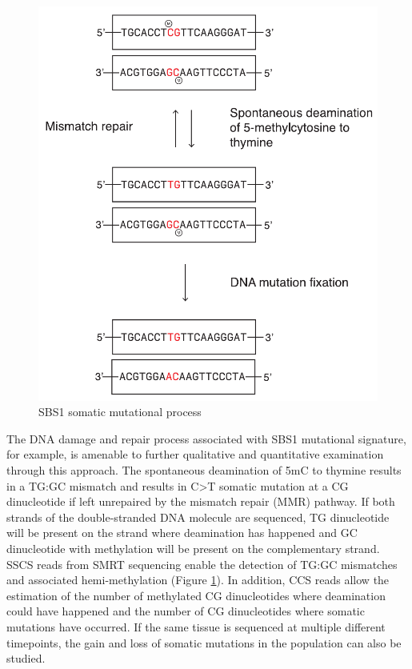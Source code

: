\begin{figure}[htbp!]
\caption{SBS1 somatic mutational process}
\label{figure:single-strand-specific-mutation}
\begin{centering}
\includegraphics[width=\textwidth]{spontaneous_deamination_horizontal.pdf} 
\end{centering}
\end{figure}

The DNA damage and repair process associated with SBS1 mutational signature, for example, is amenable to further qualitative and quantitative examination through this approach. The spontaneous deamination of 5mC to thymine results in a TG:GC mismatch and results in C>T somatic mutation at a CG dinucleotide if left unrepaired by the mismatch repair (MMR) pathway. If both strands of the double-stranded DNA molecule are sequenced, TG dinucleotide will be present on the strand where deamination has happened and GC dinucleotide with methylation will be present on the complementary strand. SSCS reads from SMRT sequencing enable the detection of TG:GC mismatches and associated hemi-methylation (Figure \ref{figure:single-strand-specific-mutation}). In addition, CCS reads allow the estimation of the number of methylated CG dinucleotides where deamination could have happened and the number of CG dinucleotides where somatic mutations have occurred. If the same tissue is sequenced at multiple different timepoints, the gain and loss of somatic mutations in the population can also be studied.

